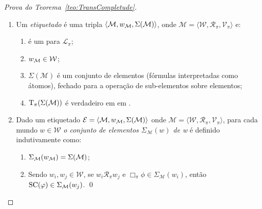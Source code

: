 \begin{apendicesenv}
\begin{proof}[Prova do Teorema~\ref{teo:TransCompletude}]
\begin{definicao}
\begin{enumerate}[label=\textnormal{\ref{def:Definicao1}.\arabic*}]
                    \item Um \textit{\PImodelo etiquetado} é uma tripla \(\langle \mathcal{M}, w_{\mathcal{M}}, \Sigma(\mathcal{M}) \rangle\), onde \(\mathcal{M} = \langle \mathcal{W},
                    \mathcal{R}_{\pi}, \mathcal{V}_{\pi} \rangle\) e:
                    \begin{enumerate}[label=(\roman*)] \label{caso:Definicao1-2}
                        \item {} é um \PImodelo para \(\mathcal{L}_{\pi}\);
                        \item \(w_{\mathcal{M}} \in \mathcal{W}\);
                        \item \(\Sigma(\mathcal{M})\) é um conjunto de elementos (fórmulas interpretadas como átomos), fechado para a operação de sub-elementos sobre
                            elementos; \label{caso:Definicao1-2-3}
                        \item \(\operatorname{T}_{\pi}(\Sigma(\mathcal{M}))\) é verdadeiro em \Mundobase em . \label{caso:Definicao1-2-4}
                    \end{enumerate}

                    \item Dado um \PImodelo etiquetado \(\mathcal{E} = \langle \mathcal{M}, w_{\mathcal{M}}, \Sigma(\mathcal{M}) \rangle\) onde
                    \(\mathcal{M} = \langle \mathcal{W}, \mathcal{R}_{\pi}, \mathcal{V}_{\pi} \rangle\), para cada mundo \(w \in \mathcal{W}\) \textit{o conjunto de elementos
                    \(\Sigma_{\mathcal{M}}(w)\) de w} é definido indutivamente como:
                        \begin{enumerate}[label=(\roman*)] \label{caso:Definicao1-3}
                            \item \(\Sigma_{\mathcal{M}}(w_{\mathcal{M}}) = \Sigma(\mathcal{M})\); \label{caso:Definicao1-3-1}
                            \item Sendo \(w_i, w_j \in \mathcal{W}\), se \(w_i \mathcal{R}_{\pi} w_j\) e \(\Box_\pi \phi \in \Sigma_{\mathcal{M}}(w_i)\),
                                    então \(\operatorname{SC}(\varphi) \in \Sigma_{\mathcal{M}}(w_j)\). \label{caso:Definicao1-3-2} \qed
                        \end{enumerate}
                \end{enumerate}
            \end{definicao}


\end{proof}
\end{apendicesenv}
